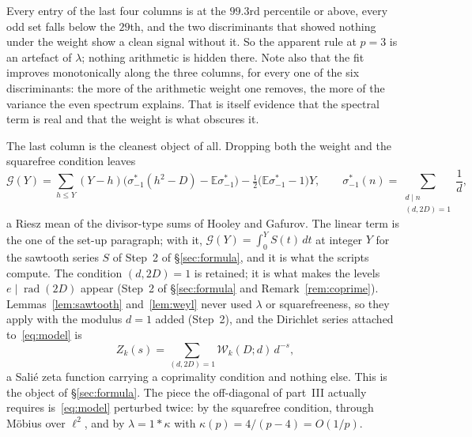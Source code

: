 \documentclass[11pt,a4paper]{article}
\theoremstyle{remark}\newtheorem{remark}[theorem]{Remark}
\begin{document}
Every entry of the last four columns is at the $99.3$rd percentile or above, every odd set falls below the $29$th, and
the two discriminants that showed nothing under the weight show a clean signal without it. So the apparent rule at
$p=3$ is an artefact of $\lambda$; nothing arithmetic is hidden there. Note also that the fit improves monotonically
along the three columns, for every one of the six discriminants: the more of the arithmetic weight one removes, the
more of the variance the even spectrum explains. That is itself evidence that the spectral term is real and that the
weight is what obscures it.

The last column is the cleanest object of all. Dropping both the weight and the squarefree condition leaves
\begin{equation}\label{eq:model}
\mathcal G(Y)=\sum_{h\le Y}(Y-h)\bigl(\sigma^{*}_{-1}(h^2-D)-\mathbb E\sigma^{*}_{-1}\bigr)-\tfrac12\bigl(\mathbb E\sigma^{*}_{-1}-1\bigr)Y,\qquad
\sigma^{*}_{-1}(n)=\sum_{\substack{d\mid n\\ (d,2D)=1}}\frac1d,
\end{equation}
a Riesz mean of the divisor-type sums of Hooley and Gafurov. The linear term is the one of the set-up paragraph;
with it, $\mathcal G(Y)=\int_0^YS(t)\,dt$ at integer $Y$ for the sawtooth series $S$ of Step~2 of
\S\ref{sec:formula}, and it is what the scripts compute. The condition $(d,2D)=1$ is retained; it is what makes
the levels $e\mid\operatorname{rad}(2D)$ appear (Step~2 of \S\ref{sec:formula} and Remark~\ref{rem:coprime}).
Lemmas~\ref{lem:sawtooth} and~\ref{lem:weyl} never used $\lambda$ or squarefreeness, so they apply with the modulus
$d=1$ added (Step~2), and the Dirichlet series attached to~\eqref{eq:model} is
\[
Z_k(s)=\sum_{(d,2D)=1}\mathcal W_k(D;d)\,d^{-s},
\]
a Sali\'e zeta function carrying a coprimality condition and nothing else. This is the object of
\S\ref{sec:formula}. The piece the off-diagonal of part~III actually requires is~\eqref{eq:model} perturbed twice:
by the squarefree condition, through M\"obius over $\ell^2$, and by $\lambda=1*\kappa$ with $\kappa(p)=4/(p-4)=O(1/p)$.
\end{document}
